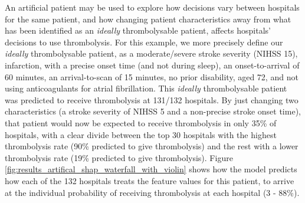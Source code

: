 \begin{itemize}
An artificial patient may be used to explore how decisions vary between hospitals for the same patient, and how changing patient characteristics away from what has been identified as an \emph{ideally} thrombolysable patient, affects hospitals' decisions to use thrombolysis. For this example, we more precisely define our \emph{ideally} thrombolysable patient, as a moderate/severe stroke severity (NIHSS 15), infarction, with a precise onset time (and not during sleep), an onset-to-arrival of 60 minutes, an arrival-to-scan of 15 minutes, no prior disability, aged 72, and not using anticoagulants for atrial fibrillation. This \emph{ideally} thrombolysable patient was predicted to receive thrombolysis at 131/132 hospitals. By just changing two characteristics (a stroke severity of NIHSS 5 and a non-precise stroke onset time), that patient would now be expected to receive thrombolysis in only 35\% of hospitals, with a clear divide between the top 30 hospitals with the highest thrombolysis rate (90\% predicted to give thrombolysis) and the rest with a lower thrombolysis rate (19\% predicted to give thrombolysis). Figure \ref{fig:results_artifical_shap_waterfall_with_violin} shows how the model predicts how each of the 132 hospitals treats the feature values for this patient, to arrive at the individual probability of receiving thrombolysis at each hospital (3 - 88\%).



\end{itemize}
